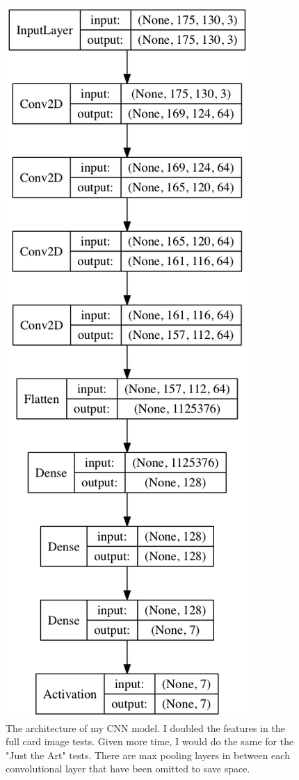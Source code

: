 \begin{figure}[b]
    \centering
    \includegraphics[width=0.7\linewidth]{figures/cnn_model.png} 
    \caption{The architecture of my CNN model. I doubled the features 
    in the full card image tests. Given more time, I would do 
    the same for the "Just the Art" tests.
    There are max pooling layers in between each convolutional layer
    that have been omitted to save space.}
    \label{fig:cnn_model}
\end{figure}